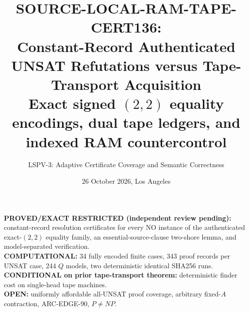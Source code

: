 \documentclass[11pt]{article}
\title{SOURCE-LOCAL-RAM-TAPE-CERT136:\\Constant-Record Authenticated UNSAT Refutations versus Tape-Transport Acquisition\\\large Exact signed $(2,2)$ equality encodings, dual tape ledgers, and indexed RAM countercontrol}
\author{LSPV-3: Adaptive Certificate Coverage and Semantic Correctness}
\date{26 October 2026, Los Angeles}
\begin{document}
\maketitle
\begin{center}\textbf{PROVED/EXACT RESTRICTED (independent review pending):} constant-record resolution certificates for every NO instance of the authenticated exact-$(2,2)$ equality family, an essential-source-clause two-shore lemma, and model-separated verification.\\
\textbf{COMPUTATIONAL:} 34 fully encoded finite cases, 343 proof records per UNSAT case, 244 $Q$ models, two deterministic identical SHA256 runs.\\
\textbf{CONDITIONAL on prior tape-transport theorem:} deterministic finder cost on single-head tape machines.\\
\textbf{OPEN:} uniformly affordable all-UNSAT proof coverage, arbitrary fixed-$A$ contraction, ARC-EDGE-90, $P\ne NP$.\end{center}
\end{document}
